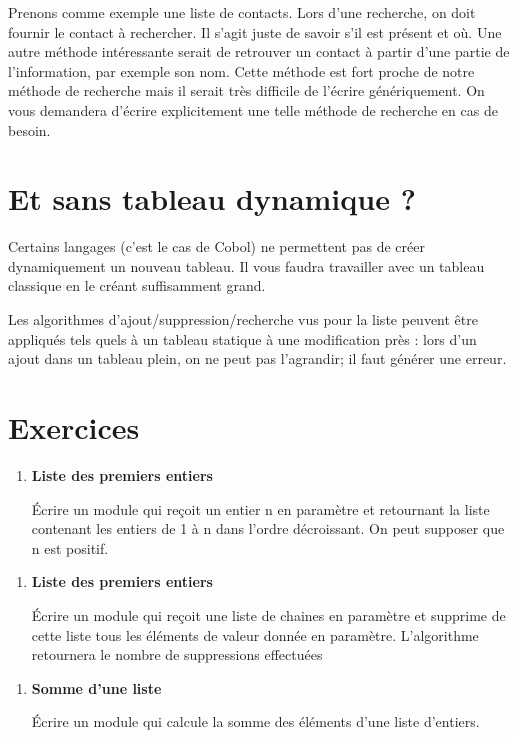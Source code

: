 Prenons comme exemple une liste de contacts.
Lors d'une recherche, on doit fournir
 le contact à
rechercher. Il s'agit juste de savoir
s'il est présent et où. Une autre méthode intéressante
serait de retrouver un contact à partir d'une partie
de l'information, par exemple son nom. Cette méthode
est fort proche de notre méthode de recherche mais il serait très
difficile de l'écrire génériquement. On vous demandera
d'écrire explicitement une telle méthode de recherche
en cas de besoin.


\section{Et sans tableau dynamique ?}

Certains langages (c’est le cas de Cobol) ne permettent pas de créer
dynamiquement un nouveau tableau. Il vous faudra travailler avec un
tableau classique en le créant suffisamment grand.


Les algorithmes d’ajout/suppression/recherche vus pour la liste peuvent
être appliqués tels quels à un tableau statique à une modification près
: lors d’un ajout dans un tableau plein, on ne peut pas l’agrandir; il
faut générer une erreur.


\section{Exercices}
\liststyleExercice
\begin{enumerate}
	\item {\sffamily\bfseries
	Liste des premiers entiers}
	
		Écrire un module qui reçoit un entier n en paramètre et retournant la
		liste contenant les entiers de 1 à n dans l'ordre
		décroissant. On peut supposer que n est positif.
	\end{enumerate}
		
	\liststyleExercice
	\setcounter{saveenum}{\value{enumi}}
	\begin{enumerate}
	\setcounter{enumi}{\value{saveenum}}
		\item {\sffamily\bfseries
		Liste des premiers entiers}
	
		Écrire un module qui reçoit une liste de chaines en paramètre et
		supprime de cette liste tous les éléments de valeur donnée en
		paramètre. L'algorithme retournera le nombre de
		suppressions effectuées
	\end{enumerate}
		
	\liststyleExercice
	\setcounter{saveenum}{\value{enumi}}
	\begin{enumerate}
	\setcounter{enumi}{\value{saveenum}}	
		\item {\sffamily\bfseries
		Somme d'une liste}
	
		Écrire un module qui calcule la somme des éléments d’une liste
		d’entiers.
	\end{enumerate}
	
